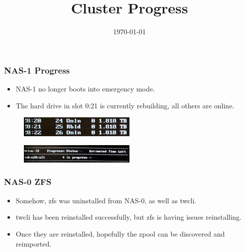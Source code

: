 \documentclass{beamer}
\title{Cluster Progress}
\date{\today}
\begin{document}

\begin{frame}
  \maketitle
\end{frame}



\begin{frame}
  \frametitle{NAS-1 Progress}

  \begin{itemize}    
  \item NAS-1 no longer boots into emergency mode. 
  \item The hard drive in slot 0:21 is currently rebuilding, all others are online.   
  \end{itemize}
  \begin{figure}[H]
    \begin{center}
      \includegraphics[width=0.5\textwidth]{nas1_drives_status.jpg}
    \end{center}
  \end{figure}

  \begin{figure}[H]
    \begin{center}
      \includegraphics[width=0.5\textwidth]{nas1_drive21_rebuild.jpg}
    \end{center}
  \end{figure}
  

\end{frame}

\begin{frame}
  \frametitle{NAS-0 ZFS}

  \begin{itemize}
  \item Somehow, zfs was uninstalled from NAS-0, as well as twcli.
  \item twcli has been reinstalled successfully, but zfs is having issues reinstalling.
  \item Once they are reinstalled, hopefully the zpool can be discovered and reimported.   
  \end{itemize}
  
\end{frame}
\end{document}
